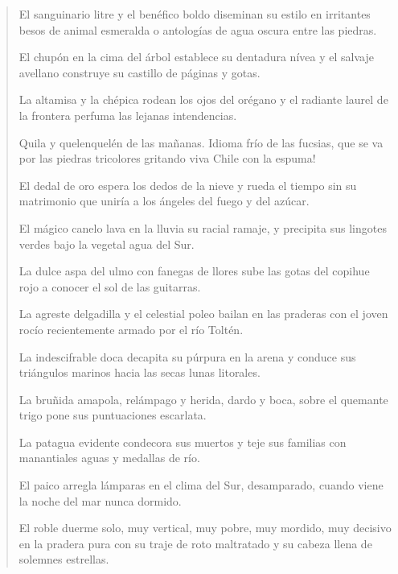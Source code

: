 \documentclass[12pt]{article}
\begin{document}
\clearpage
{}
\begin{verse}
El sanguinario litre y el benéfico boldo
diseminan su estilo
en irritantes besos de animal esmeralda
o antologías de agua oscura entre las piedras.

	El chupón en la cima del árbol establece
	su dentadura nívea
	y el salvaje avellano construye su castillo
	de páginas y gotas.

La altamisa y la chépica rodean
los ojos del orégano
y el radiante laurel de la frontera
perfuma las lejanas intendencias.

	Quila y quelenquelén de las mañanas.
	Idioma frío de las fucsias,
	que se va por las piedras tricolores
	gritando viva Chile con la espuma!

El dedal de oro espera
los dedos de la nieve
y rueda el tiempo sin su matrimonio
que uniría a los ángeles del fuego y del azúcar.

	El mágico canelo
	lava en la lluvia su racial ramaje,
	y precipita sus lingotes verdes
	bajo la vegetal agua del Sur.

La dulce aspa del ulmo
con fanegas de llores
sube las gotas del copihue rojo
a conocer el sol de las guitarras.

	La agreste delgadilla
	y el celestial poleo
	bailan en las praderas con el joven rocío
	recientemente armado por el río Toltén.

La indescifrable doca
decapita su púrpura en la arena
y conduce sus triángulos marinos
hacia las secas lunas litorales.

	La bruñida amapola,
	relámpago y herida, dardo y boca,
	sobre el quemante trigo
	pone sus puntuaciones escarlata.

La patagua evidente
condecora sus muertos
y teje sus familias
con manantiales aguas y medallas de río.

	El paico arregla lámparas
	en el clima del Sur, desamparado,
	cuando viene la noche
	del mar nunca dormido.

El roble duerme solo,
muy vertical, muy pobre, muy mordido,
muy decisivo en la pradera pura
con su traje de roto maltratado
y su cabeza llena de solemnes estrellas.

\end{verse}
\end{document}
